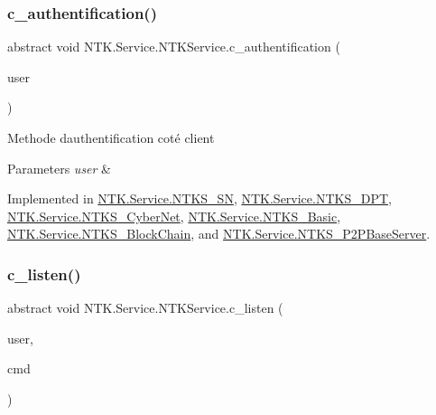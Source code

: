 \subsubsection{\texorpdfstring{c\_authentification()}{c\_authentification()}}
{\footnotesize\ttfamily abstract void N\+T\+K.\+Service.\+N\+T\+K\+Service.\+c\+\_\+authentification (\begin{DoxyParamCaption}\item[{\mbox{\hyperlink{class_n_t_k_1_1_n_t_k_user}{N\+T\+K\+User}}}]{user }\end{DoxyParamCaption})\hspace{0.3cm}{\ttfamily [pure virtual]}}



Methode d\textquotesingle{}authentification coté client 


\begin{DoxyParams}{Parameters}
{\em user} & \\
\hline
\end{DoxyParams}


Implemented in \mbox{\hyperlink{class_n_t_k_1_1_service_1_1_n_t_k_s___s_n_ac025f78ece6a9012aeb014fbd486aee7}{N\+T\+K.\+Service.\+N\+T\+K\+S\+\_\+\+SN}}, \mbox{\hyperlink{class_n_t_k_1_1_service_1_1_n_t_k_s___d_p_t_a6ebeaaab18026e60204f922c8f3780cb}{N\+T\+K.\+Service.\+N\+T\+K\+S\+\_\+\+D\+PT}}, \mbox{\hyperlink{class_n_t_k_1_1_service_1_1_n_t_k_s___cyber_net_aafeaa95314fc42dad77b9488f10be803}{N\+T\+K.\+Service.\+N\+T\+K\+S\+\_\+\+Cyber\+Net}}, \mbox{\hyperlink{class_n_t_k_1_1_service_1_1_n_t_k_s___basic_a3cf6fce0651874b00a85d3a94515c059}{N\+T\+K.\+Service.\+N\+T\+K\+S\+\_\+\+Basic}}, \mbox{\hyperlink{class_n_t_k_1_1_service_1_1_n_t_k_s___block_chain_ab29505226ecfe9bce4385aaa776a14d7}{N\+T\+K.\+Service.\+N\+T\+K\+S\+\_\+\+Block\+Chain}}, and \mbox{\hyperlink{class_n_t_k_1_1_service_1_1_n_t_k_s___p2_p_base_server_a7a8a841137b8fcce5cf7c1f122d732f5}{N\+T\+K.\+Service.\+N\+T\+K\+S\+\_\+\+P2\+P\+Base\+Server}}.

\mbox{\label{class_n_t_k_1_1_service_1_1_n_t_k_service_a5f591a8d31f2e2b01fc47a17a4102574}} 
\subsubsection{\texorpdfstring{c\_listen()}{c\_listen()}}
{\footnotesize\ttfamily abstract void N\+T\+K.\+Service.\+N\+T\+K\+Service.\+c\+\_\+listen (\begin{DoxyParamCaption}\item[{\mbox{\hyperlink{class_n_t_k_1_1_n_t_k_user}{N\+T\+K\+User}}}]{user,  }\item[{String}]{cmd }\end{DoxyParamCaption})\hspace{0.3cm}{\ttfamily [pure virtual]}}



